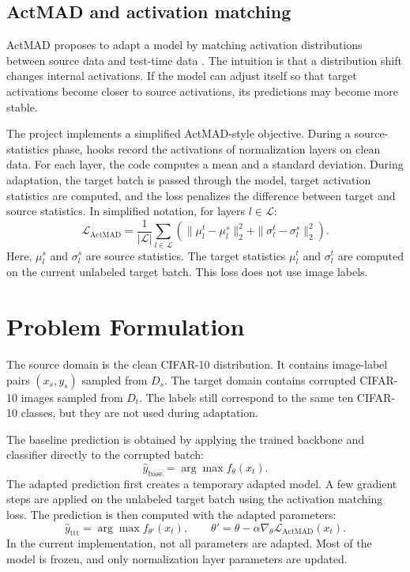 \documentclass[a4paper,11pt]{article}
\begin{document}
\subsection{ActMAD and activation matching}

ActMAD proposes to adapt a model by matching activation distributions between source data and test-time data \citep{mirza2023actmad}. The intuition is that a distribution shift changes internal activations. If the model can adjust itself so that target activations become closer to source activations, its predictions may become more stable.

The project implements a simplified ActMAD-style objective. During a source-statistics phase, hooks record the activations of normalization layers on clean data. For each layer, the code computes a mean and a standard deviation. During adaptation, the target batch is passed through the model, target activation statistics are computed, and the loss penalizes the difference between target and source statistics. In simplified notation, for layers \(l\in\mathcal{L}\):
\[
\mathcal{L}_{\text{ActMAD}}=\frac{1}{|\mathcal{L}|}\sum_{l\in\mathcal{L}}\left(\|\mu_l^t-\mu_l^s\|_2^2+\|\sigma_l^t-\sigma_l^s\|_2^2\right).
\]
Here, \(\mu_l^s\) and \(\sigma_l^s\) are source statistics. The target statistics \(\mu_l^t\) and \(\sigma_l^t\) are computed on the current unlabeled target batch. This loss does not use image labels.

\section{Problem Formulation}

The source domain is the clean CIFAR-10 distribution. It contains image-label pairs \((x_s,y_s)\) sampled from \(D_s\). The target domain contains corrupted CIFAR-10 images sampled from \(D_t\). The labels still correspond to the same ten CIFAR-10 classes, but they are not used during adaptation.

The baseline prediction is obtained by applying the trained backbone and classifier directly to the corrupted batch:
\[
\hat{y}_{\text{base}}=\arg\max f_\theta(x_t).
\]
The adapted prediction first creates a temporary adapted model. A few gradient steps are applied on the unlabeled target batch using the activation matching loss. The prediction is then computed with the adapted parameters:
\[
\hat{y}_{\text{ttt}}=\arg\max f_{\theta'}(x_t),\qquad \theta'=\theta-\alpha\nabla_\theta\mathcal{L}_{\text{ActMAD}}(x_t).
\]
In the current implementation, not all parameters are adapted. Most of the model is frozen, and only normalization layer parameters are updated.
\end{document}
